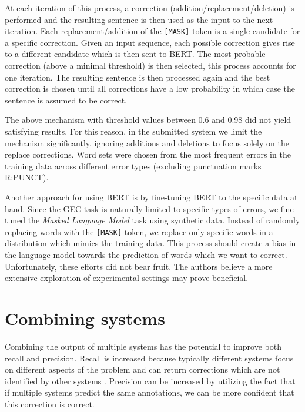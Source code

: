 \documentclass[11pt,a4paper]{article}
\begin{document}
At each iteration of this process, a correction (addition/replacement/deletion) is performed and the resulting sentence is then used as the input to the next iteration.
Each replacement/addition of the \verb|[MASK]| token is a single candidate for a specific correction. Given an input sequence, each possible correction gives rise to a different candidate which is then sent to BERT. The most probable correction (above a minimal threshold) is then selected, this process accounts for one iteration. The resulting sentence is then processed again and the best correction is chosen until all corrections have a low probability in which case the sentence is assumed to be correct.







The above mechanism with threshold values between 0.6 and 0.98 did not yield satisfying results. For this reason, in the submitted system we limit the mechanism significantly, ignoring additions and deletions to focus solely on the replace corrections. Word sets were chosen from the most frequent errors in the training data across different error types (excluding punctuation marks R:PUNCT).

Another approach for using BERT is by fine-tuning BERT to the specific data at hand. Since the GEC task is naturally limited to specific types of errors, we fine-tuned the \textit{Masked Language Model} task using synthetic data. Instead of randomly replacing words with the \verb|[MASK]| token, we replace only specific words in a distribution which mimics the training data. This process should create a bias in the language model towards the prediction of words which we want to correct. Unfortunately, these efforts did not bear fruit. The authors believe a more extensive exploration of experimental settings may prove beneficial.  \section{Combining systems} \label{sec:comb}
 Combining the output of multiple systems has the potential to improve both recall and precision. Recall is increased because typically different systems focus on different aspects of the problem and can return corrections which are not identified by other systems \cite{Bryant2017AutomaticAA}. Precision can be increased by utilizing the fact that if multiple systems predict the same annotations, we can be more confident that this correction is correct.  
 
\end{document}
